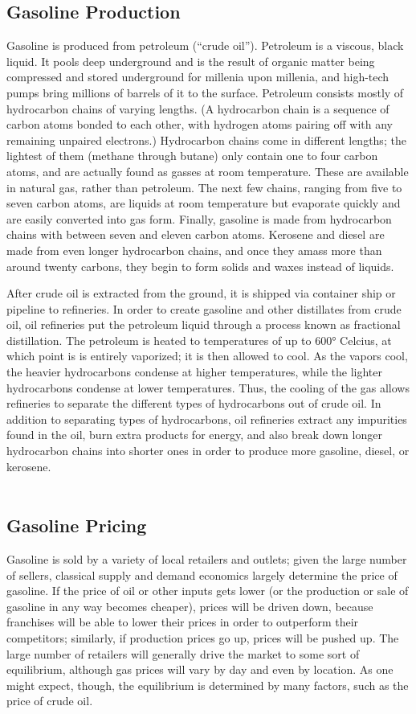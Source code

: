 \documentclass[11pt,twocolumn]{article}
\newcommand{\tab}[0] {\hspace*{24pt}}
\begin{document}
\subsection*{Gasoline Production}
\tab Gasoline is produced from petroleum (``crude oil''). Petroleum is a viscous, black liquid. It pools deep underground and is the result of organic matter being compressed and stored underground for millenia upon millenia, and high-tech pumps bring millions of barrels of it to the surface. Petroleum consists mostly of hydrocarbon chains of varying lengths. (A hydrocarbon chain is a sequence of carbon atoms bonded to each other, with hydrogen atoms pairing off with any remaining unpaired electrons.) Hydrocarbon chains come in different lengths; the lightest of them (methane through butane) only contain one to four carbon atoms, and are actually found as gasses at room temperature. These are available in natural gas, rather than petroleum. The next few chains, ranging from five to seven carbon atoms, are liquids at room temperature but evaporate quickly and are easily converted into gas form. Finally, gasoline is made from hydrocarbon chains with between seven and eleven carbon atoms. Kerosene and diesel are made from even longer hydrocarbon chains, and once they amass more than around twenty carbons, they begin to form solids and waxes instead of liquids. 

\tab After crude oil is extracted from the ground, it is shipped via container ship or pipeline to refineries. In order to create gasoline and other distillates from crude oil, oil refineries put the petroleum liquid through a process known as fractional distillation. The petroleum is heated to temperatures of up to 600° Celcius, at which point is is entirely vaporized; it is then allowed to cool. As the vapors cool, the heavier hydrocarbons condense at higher temperatures, while the lighter hydrocarbons condense at lower temperatures. Thus, the cooling of the gas allows refineries to separate the different types of hydrocarbons out of crude oil. In addition to separating types of hydrocarbons, oil refineries extract any impurities found in the oil, burn extra products for energy, and also break down longer hydrocarbon chains into shorter ones in order to produce more gasoline, diesel, or kerosene. 
\\\\
\subsection*{Gasoline Pricing}
\tab Gasoline is sold by a variety of local retailers and outlets; given the large number of sellers, classical supply and demand economics largely determine the price of gasoline. If the price of oil or other inputs gets lower (or the production or sale of gasoline in any way becomes cheaper), prices will be driven down, because franchises will be able to lower their prices in order to outperform their competitors; similarly, if production prices go up, prices will be pushed up. The large number of retailers will generally drive the market to some sort of equilibrium, although gas prices will vary by day and even by location. As one might expect, though, the equilibrium is determined by many factors, such as the price of crude oil. 
\end{document}

